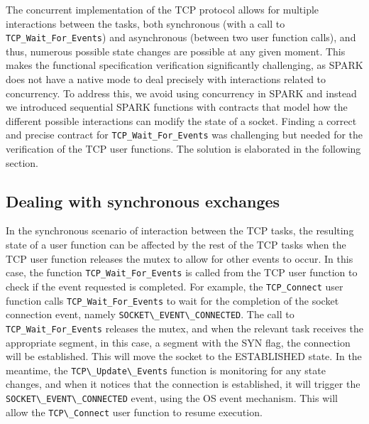 \documentclass[conference]{IEEEtran}
\def\spark#1{\lstinline[language=Ada]{#1}}
\def\state#1{\textsf{\MakeUppercase{#1}}\xspace}
\def\sestab{\state{established}}
\def\flag#1{\textsf{#1}\xspace}
\def\syn{\flag{SYN}}
\begin{document}


%


The concurrent implementation of the TCP protocol allows for multiple interactions between the tasks, both synchronous (with a call to \spark{TCP_Wait_For_Events}) and asynchronous (between two user function calls), and thus, numerous possible state changes are possible at any given moment. This makes the functional specification verification significantly challenging, as SPARK does not have a native mode to deal precisely with interactions related to concurrency. To address this, we avoid using concurrency in SPARK and instead we introduced sequential SPARK functions with contracts that model how the different possible interactions can modify the state of a socket. Finding a correct and precise contract for \spark{TCP_Wait_For_Events} was challenging but needed for the verification of the TCP user functions. The solution is elaborated in the following section.


\subsection{Dealing with synchronous exchanges}

In the synchronous scenario of interaction between the TCP tasks, the resulting state of a user function can be affected by the rest of the TCP tasks when the TCP user function releases the mutex to allow for other events to occur. In this case, the function \spark{TCP_Wait_For_Events} is called from the TCP user function to check if the event requested is completed. For example, the \spark{TCP_Connect} user function calls \spark{TCP_Wait_For_Events} to wait for the completion of the socket connection event, namely \spark{SOCKET\_EVENT\_CONNECTED}. The call to \spark{TCP_Wait_For_Events} releases the mutex, and when the relevant task receives the appropriate segment, in this case, a segment with the \syn flag, the connection will be established. This will move the socket to the \sestab state. In the meantime, the \spark{TCP\_Update\_Events} function is monitoring for any state changes, and when it notices that the connection is established, it will trigger the \spark{SOCKET\_EVENT\_CONNECTED} event, using the OS event mechanism. This will allow the \spark{TCP\_Connect} user function to resume execution.
\end{document}
